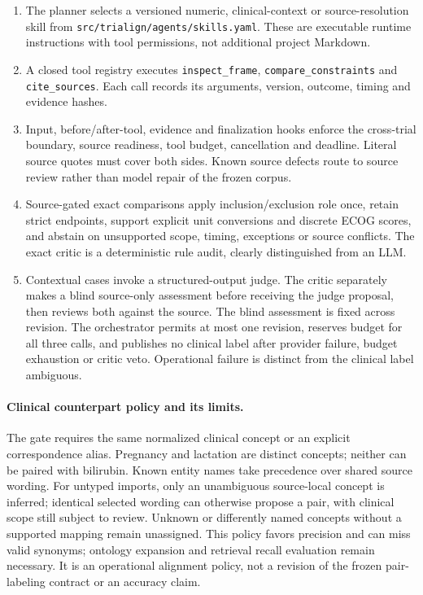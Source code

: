 \documentclass[10pt,letterpaper]{article}
\newcommand{\pathcode}[1]{\nolinkurl{#1}}
\begin{document}
\begin{enumerate}
\item The planner selects a versioned numeric, clinical-context or source-resolution
skill from \pathcode{src/trialign/agents/skills.yaml}. These are executable
runtime instructions with tool permissions, not additional project Markdown.
\item A closed tool registry executes \pathcode{inspect_frame},
\pathcode{compare_constraints} and \pathcode{cite_sources}. Each call records
its arguments, version, outcome, timing and evidence hashes.
\item Input, before/after-tool, evidence and finalization hooks enforce the
cross-trial boundary, source readiness, tool budget, cancellation and deadline.
Literal source quotes must cover both sides. Known source defects route to
source review rather than model repair of the frozen corpus.
\item Source-gated exact comparisons apply inclusion/exclusion role once,
retain strict endpoints, support explicit unit conversions and discrete ECOG
scores, and abstain on unsupported scope, timing, exceptions or source conflicts.
The exact critic is a deterministic rule audit, clearly distinguished from an LLM.
\item Contextual cases invoke a structured-output judge. The critic separately
makes a blind source-only assessment before receiving the judge proposal, then
reviews both against the source. The blind assessment is fixed across revision.
The orchestrator permits at most one revision, reserves budget for all three calls,
and publishes no clinical label after provider failure, budget exhaustion or
critic veto. Operational failure is distinct from the clinical label ambiguous.
\end{enumerate}

\paragraph{Clinical counterpart policy and its limits.}
The gate requires the same normalized clinical concept or an explicit
correspondence alias. Pregnancy and lactation are distinct concepts; neither
can be paired with bilirubin. Known entity names take precedence over shared
source wording. For untyped imports, only an unambiguous source-local concept
is inferred; identical selected wording can otherwise propose a pair, with
clinical scope still subject to review. Unknown or differently named concepts
without a supported mapping remain unassigned. This policy favors precision
and can miss valid synonyms; ontology expansion and retrieval recall evaluation
remain necessary. It is an operational alignment policy, not a revision of the
frozen pair-labeling contract or an accuracy claim.
\end{document}
